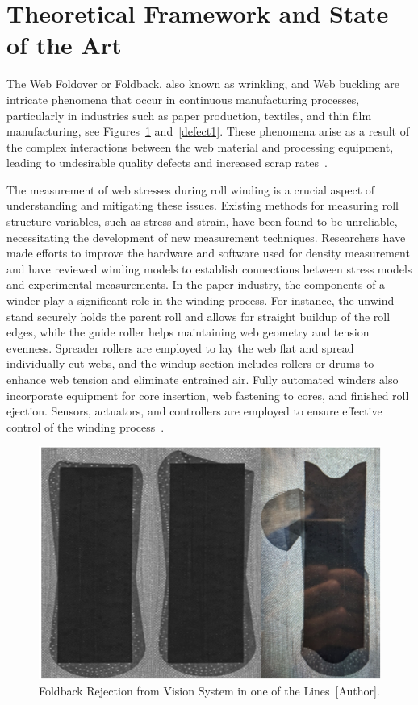 \section{Theoretical Framework and State of the Art}
The Web Foldover or Foldback, also known as wrinkling, and Web buckling are intricate phenomena that occur in continuous manufacturing processes, particularly in industries such as paper production, textiles, and thin film manufacturing, see Figures~\ref{foldback} and~\ref{defect1}. These phenomena arise as a result of the complex interactions between the web material and processing equipment, leading to undesirable quality defects and increased scrap rates~\cite{Hashimoto2007PredictionMO,rosiumconference}. 

The measurement of web stresses during roll winding is a crucial aspect of understanding and mitigating these issues. Existing methods for measuring roll structure variables, such as stress and strain, have been found to be unreliable, necessitating the development of new measurement techniques. Researchers have made efforts to improve the hardware and software used for density measurement and have reviewed winding models to establish connections between stress models and experimental measurements. In the paper industry, the components of a winder play a significant role in the winding process. For instance, the unwind stand securely holds the parent roll and allows for straight buildup of the roll edges, while the guide roller helps maintaining web geometry and tension evenness. Spreader rollers are employed to lay the web flat and spread individually cut webs, and the windup section includes rollers or drums to enhance web tension and eliminate entrained air. Fully automated winders also incorporate equipment for core insertion, web fastening to cores, and finished roll ejection. Sensors, actuators, and controllers are employed to ensure effective control of the winding process~\cite{rosiumconference,roisum1990measurement}. 
\begin{figure}[H]
        \centering
    \includegraphics[width=0.55\linewidth]{FIGURES/foldback.png}
    \caption{Foldback Rejection from Vision System in one of the Lines~[Author].}
    \label{foldback}
\end{figure}

